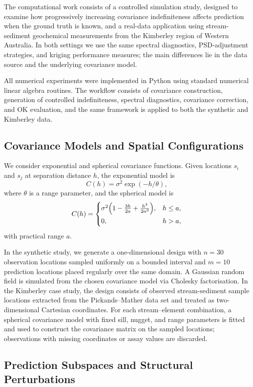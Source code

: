 \documentclass[smallextended]{svjour3}
\newcommand{\1}{\mathbf{1}}
\begin{document}
The computational work consists of a controlled simulation study, designed to examine how progressively increasing covariance indefiniteness affects prediction when the ground truth is known, and a real-data
application using stream-sediment geochemical measurements from the Kimberley region of Western Australia. In both settings we use the same spectral diagnostics, PSD-adjustment strategies, and kriging performance measures; the main differences lie in the data source and the underlying covariance model.

All numerical experiments were implemented in Python using standard numerical linear algebra routines. The workflow consists of covariance construction, generation of controlled indefiniteness, spectral diagnostics, covariance correction, and OK evaluation, and the same framework is applied to both the synthetic and Kimberley data.

\subsection{Covariance Models and Spatial Configurations}

We consider exponential and spherical covariance functions. Given locations $s_i$ and $s_j$ at separation distance $h$, the exponential model is
\[
C(h) = \sigma^2 \exp(-h/\theta),
\]
where $\theta$ is a range parameter, and the spherical model is
\[
C(h) =
\begin{cases}
	\sigma^2
	\Bigl(
	1-\frac{3h}{2a}+\frac{h^3}{2a^3}
	\Bigr),
	& h \le a,\\[1ex]
	0,& h>a,
\end{cases}
\]
with practical range $a$.

In the synthetic study, we generate a one-dimensional design with $n=30$ observation locations sampled uniformly on a bounded interval and $m=10$ prediction locations placed regularly over the same domain. A Gaussian random field is simulated from the chosen covariance model via Cholesky factorisation. In the Kimberley case study, the design consists of observed stream-sediment sample locations extracted from the Pickands–Mather data set and treated as two-dimensional Cartesian coordinates. For each stream–element combination, a spherical covariance model with fixed sill, nugget, and range parameters is fitted and used to construct the covariance matrix on the sampled locations; observations with missing coordinates or assay values are discarded.

\subsection{Prediction Subspaces and Structural Perturbations}
\end{document}
